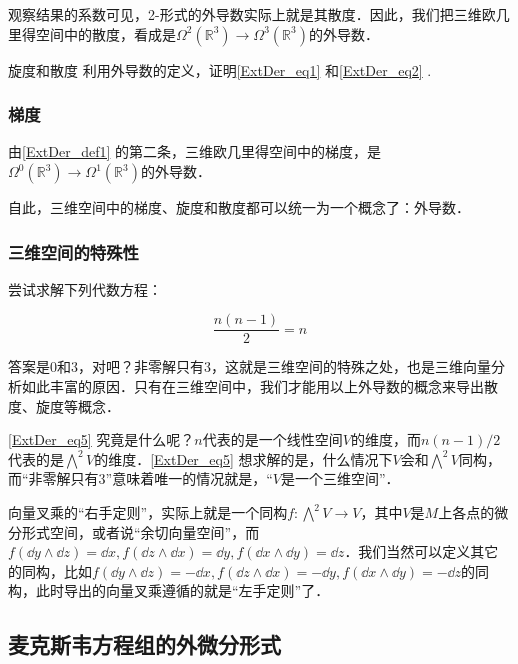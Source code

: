 观察结果的系数可见，2-形式的外导数实际上就是其散度．因此，我们把三维欧几里得空间中的散度，看成是$\Omega^2(\mathbb{R}^3)\rightarrow\Omega^3(\mathbb{R}^3)$的外导数．

\begin{exercise}{旋度和散度}
利用外导数的定义，证明\autoref{ExtDer_eq1} 和\autoref{ExtDer_eq2} .
\end{exercise}

\subsubsection{梯度}

由\autoref{ExtDer_def1} 的第二条，三维欧几里得空间中的梯度，是$\Omega^0(\mathbb{R}^3)\rightarrow\Omega^1(\mathbb{R}^3)$的外导数．

自此，三维空间中的梯度、旋度和散度都可以统一为一个概念了：外导数．

\subsubsection{三维空间的特殊性}

尝试求解下列代数方程：

\begin{equation}\label{ExtDer_eq5}
\frac{n(n-1)}{2}=n
\end{equation}

答案是$0$和$3$，对吧？非零解只有$3$，这就是三维空间的特殊之处，也是三维向量分析如此丰富的原因．只有在三维空间中，我们才能用以上外导数的概念来导出散度、旋度等概念．

\autoref{ExtDer_eq5} 究竟是什么呢？$n$代表的是一个线性空间$V$的维度，而$n(n-1)/2$代表的是$\bigwedge^2 V$的维度．\autoref{ExtDer_eq5} 想求解的是，什么情况下$V$会和$\bigwedge^2 V$同构，而“非零解只有$3$”意味着唯一的情况就是，“$V$是一个三维空间”．

向量叉乘的“右手定则”，实际上就是一个同构$f:\bigwedge^2 V\to V$，其中$V$是$M$上各点的微分形式空间，或者说“余切向量空间”，而$f(\dd y\wedge \dd z)=\dd x, f(\dd z\wedge \dd x)=\dd y, f(\dd x\wedge \dd y)=\dd z$．我们当然可以定义其它的同构，比如$f(\dd y\wedge \dd z)=-\dd x, f(\dd z\wedge \dd x)=-\dd y, f(\dd x\wedge \dd y)=-\dd z$的同构，此时导出的向量叉乘遵循的就是“左手定则”了．



\subsection{麦克斯韦方程组的外微分形式}

